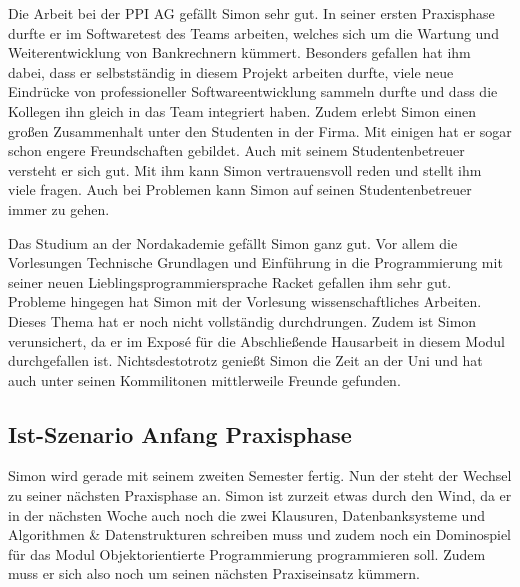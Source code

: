 \documentclass[
  12pt,
  ngerman,
  a4paper,
]{article}
\begin{document}
Die Arbeit bei der PPI AG gefällt Simon sehr gut. In seiner ersten
Praxisphase durfte er im Softwaretest des Teams arbeiten, welches sich
um die Wartung und Weiterentwicklung von Bankrechnern kümmert. Besonders
gefallen hat ihm dabei, dass er selbstständig in diesem Projekt arbeiten
durfte, viele neue Eindrücke von professioneller Softwareentwicklung
sammeln durfte und dass die Kollegen ihn gleich in das Team integriert
haben. Zudem erlebt Simon einen großen Zusammenhalt unter den Studenten
in der Firma. Mit einigen hat er sogar schon engere Freundschaften
gebildet. Auch mit seinem Studentenbetreuer versteht er sich gut. Mit
ihm kann Simon vertrauensvoll reden und stellt ihm viele fragen. Auch
bei Problemen kann Simon auf seinen Studentenbetreuer immer zu gehen.

Das Studium an der Nordakademie gefällt Simon ganz gut. Vor allem die
Vorlesungen Technische Grundlagen und Einführung in die Programmierung
mit seiner neuen Lieblingsprogrammiersprache Racket gefallen ihm sehr
gut. Probleme hingegen hat Simon mit der Vorlesung wissenschaftliches
Arbeiten. Dieses Thema hat er noch nicht vollständig durchdrungen. Zudem
ist Simon verunsichert, da er im Exposé für die Abschließende Hausarbeit
in diesem Modul durchgefallen ist. Nichtsdestotrotz genießt Simon die
Zeit an der Uni und hat auch unter seinen Kommilitonen mittlerweile
Freunde gefunden.

\hypertarget{ist-szenario-anfang-praxisphase}{%
\subsection{Ist-Szenario Anfang
Praxisphase}\label{ist-szenario-anfang-praxisphase}}

Simon wird gerade mit seinem zweiten Semester fertig. Nun der steht der
Wechsel zu seiner nächsten Praxisphase an. Simon ist zurzeit etwas durch
den Wind, da er in der nächsten Woche auch noch die zwei Klausuren,
Datenbanksysteme und Algorithmen \& Datenstrukturen schreiben muss und
zudem noch ein Dominospiel für das Modul Objektorientierte
Programmierung programmieren soll. Zudem muss er sich also noch um
seinen nächsten Praxiseinsatz kümmern.
\end{document}
